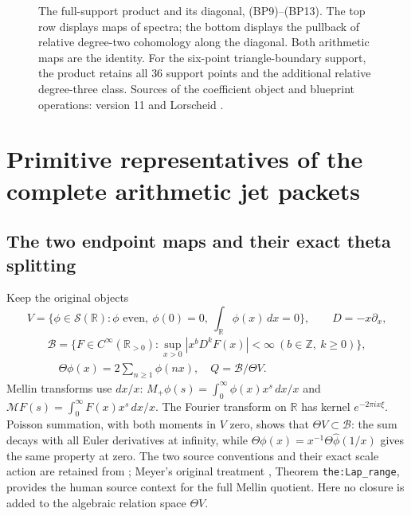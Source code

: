\documentclass[11pt,a4paper]{article}
\theoremstyle{definition}\newtheorem{definition}[theorem]{Definition}
\begin{document}
\begin{figure}[ht]
\centering
{}
\caption{The full-support product and its diagonal, (BP9)--(BP13).
The top row displays maps of spectra; the bottom displays the pullback
of relative degree-two cohomology along the diagonal. Both arithmetic
maps are the identity. For the six-point triangle-boundary support,
the product retains all $36$ support points and the additional relative
degree-three class. Sources of the coefficient object and blueprint
operations: version 11 \cite{support} and Lorscheid \cite{lorscheid}.}
\end{figure}

\section{Primitive representatives of the complete arithmetic jet packets}


\subsection{The two endpoint maps and their exact theta splitting}
Keep the original objects
\[
 V=\{\phi\in\mathcal S(\mathbb R):\phi\text{ even},\
       \phi(0)=0,\ \int_{\mathbb R}\phi(x)\,dx=0\},\qquad D=-x\partial_x,
\]
\[
 \begin{gathered}\mathscr B=\{F\in C^\infty(\mathbb R_{>0}):
       \sup_{x>0}|x^bD^kF(x)|<\infty\ (b\in\mathbb Z,\ k\ge0)\},\\
 \quad \Theta\phi(x)=2\sum_{n\ge1}\phi(nx),\quad Q=\mathscr B/\Theta V.
 \end{gathered}\tag{PL1}\label{pl:pl:spaces}
\]
Mellin transforms use \(dx/x\): \(M_+\phi(s)=\int_0^\infty
\phi(x)x^s\,dx/x\) and \(\mathcal M F(s)=\int_0^\infty F(x)x^s\,dx/x\).
The Fourier transform on \(\mathbb R\) has kernel \(e^{-2\pi ix\xi}\).
Poisson summation, with both moments in \(V\) zero, shows that
\(\Theta V\subset\mathscr B\): the sum decays with all Euler derivatives at
infinity, while
\(\Theta\phi(x)=x^{-1}\Theta\widehat\phi(1/x)\) gives the same property
at zero. The two source conventions and their exact scale action are
retained from \cite{FJtau,PLoperator}; Meyer's original treatment
\cite{Meyer}, Theorem \texttt{the:Lap\_range}, provides the human
source context for the full Mellin quotient. Here no closure is added
to the algebraic relation space \(\Theta V\).
\end{document}
